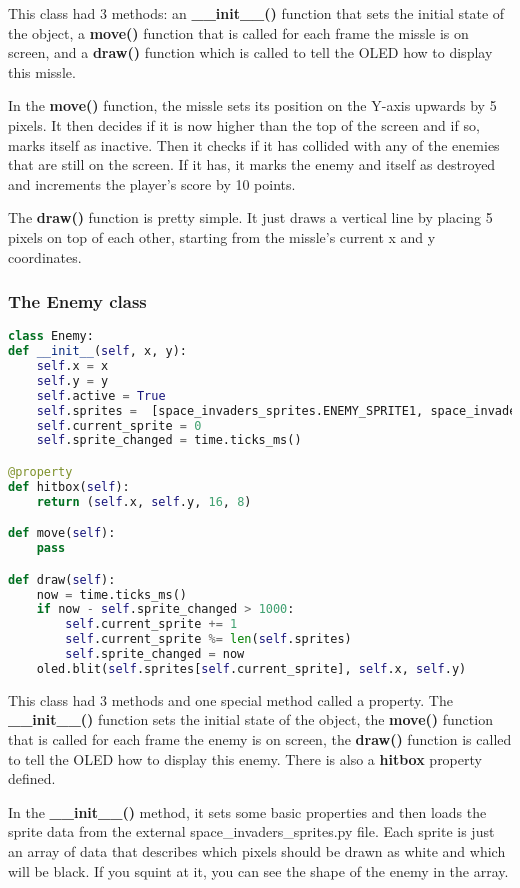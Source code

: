 This class had 3 methods: an \textbf{\_\_init\_\_()} function that sets the initial state of the object,
a \textbf{move()} function that is called for each frame the missle is on screen, and a \textbf{draw()}
function which is called to tell the OLED how to display this missle.

In the \textbf{move()} function, the missle sets its position on the Y-axis upwards by 5 pixels. It then decides
if it is now higher than the top of the screen and if so, marks itself as inactive. Then it checks if it
has collided with any of the enemies that are still on the screen. If it has, it marks the enemy and
itself as destroyed and increments the player's score by 10 points.

The \textbf{draw()} function is pretty simple. It just draws a vertical line by placing 5 pixels on top of each
other, starting from the missle's current x and y coordinates.

\subsubsection{The Enemy class}
\begin{lstlisting}[language=Python,caption=The Enemy class]
class Enemy:
def __init__(self, x, y):
    self.x = x
    self.y = y
    self.active = True
    self.sprites =  [space_invaders_sprites.ENEMY_SPRITE1, space_invaders_sprites.ENEMY_SPRITE2]
    self.current_sprite = 0
    self.sprite_changed = time.ticks_ms()

@property
def hitbox(self):
    return (self.x, self.y, 16, 8)

def move(self):
    pass

def draw(self):
    now = time.ticks_ms()
    if now - self.sprite_changed > 1000:
        self.current_sprite += 1
        self.current_sprite %= len(self.sprites)
        self.sprite_changed = now
    oled.blit(self.sprites[self.current_sprite], self.x, self.y)
\end{lstlisting}

This class had 3 methods and one special method called a property. The \textbf{\_\_init\_\_()} function sets the
initial state of the object, the \textbf{move()} function that is called for each frame the enemy is on screen,
the \textbf{draw()} function is called to tell the OLED how to display this enemy. There is also a \textbf{hitbox}
property defined.

In the \textbf{\_\_init\_\_()} method, it sets some basic properties and then loads the sprite data from the external
space\_invaders\_sprites.py file. Each sprite is just an array of data that describes which pixels should be drawn
as white and which will be black. If you squint at it, you can see the shape of the enemy in the array.

